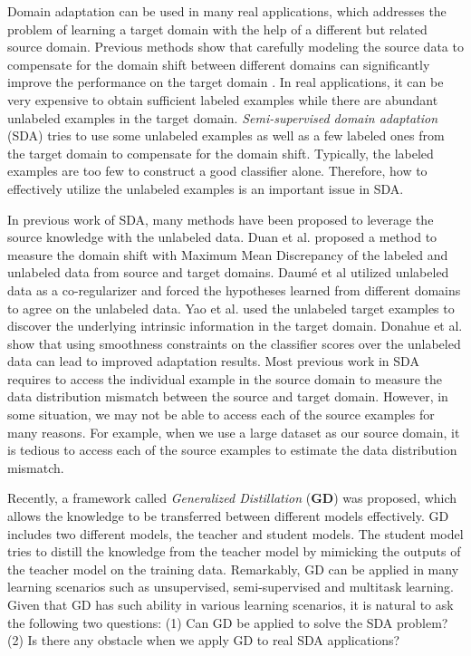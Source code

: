 Domain adaptation can be used in many real applications, which addresses the problem of learning a target domain with the help of a different but related source domain. Previous methods show that carefully modeling the source data to compensate for the domain shift between different domains can significantly improve the performance on the target domain \cite{Donahue_2013_CVPR}. In real applications, it can be very expensive to obtain sufficient labeled examples while there are abundant unlabeled examples in the target domain. 
\textit{Semi-supervised domain adaptation} (SDA) tries to use some unlabeled examples as well as a few labeled ones from the target domain to compensate for the domain shift\cite{karl2001long}. Typically, the labeled examples are too few to construct a good classifier alone. Therefore, how to effectively utilize the unlabeled examples is an important issue in SDA. 

In previous work of SDA, many methods have been proposed to leverage the source knowledge with the unlabeled data.
Duan et al.\cite{duan2012visual} proposed a method to measure the domain shift with Maximum Mean Discrepancy of the labeled and unlabeled data from source and target domains. Daum{\'e} et al\cite{daume2010frustratingly} utilized unlabeled data as a co-regularizer and forced the hypotheses learned from different domains to agree on the unlabeled data. Yao et al.\cite{yao2015semi} used the unlabeled target examples to discover the underlying intrinsic information in the target domain. Donahue et al.\cite{Donahue_2013_CVPR} show that using smoothness constraints on the classifier scores over the unlabeled data can lead to improved adaptation results.
Most previous work in SDA requires to access the individual example in the source domain to measure the data distribution mismatch between the source and target domain.
However, in some situation, we may not be able to access each of the source examples for many reasons. For example, when we use a large dataset as our source domain, it is tedious to access each of the source examples to estimate the data distribution mismatch.

Recently, a framework called \textit{Generalized Distillation} (\textbf{GD}) \cite{lopez2015unifying} was proposed, which allows the knowledge to be transferred between different models effectively. GD includes two different models, the teacher and student models. The student model tries to distill the knowledge from the teacher model by mimicking the outputs of the teacher model on the training data. Remarkably, GD can be applied in many learning scenarios such as unsupervised, semi-supervised and multitask learning\cite{lopez2015unifying}. Given that GD has such ability in various learning scenarios, it is natural to ask the following two questions: (1) Can GD be applied to solve the SDA problem? (2) Is there any obstacle when we apply GD to real SDA applications?

